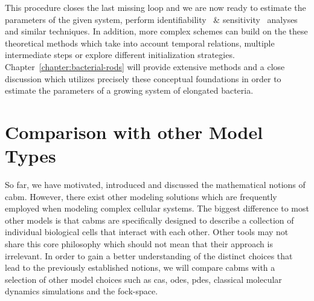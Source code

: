 This procedure closes the last missing loop and we are now ready to estimate the parameters of the
given system, perform identifiability~\cite{Raue2009} \& sensitivity~\cite{Saltelli2007} analyses
and similar techniques.
In addition, more complex schemes can build on the these theoretical methods which take into account
temporal relations, multiple intermediate steps or explore different initialization strategies.
Chapter~\ref{chapter:bacterial-rods} will provide extensive methods and a close discussion which
utilizes precisely these conceptual foundations in order to estimate the parameters of a growing
system of elongated bacteria.

\section{Comparison with other Model Types}
So far, we have motivated, introduced and discussed the mathematical notions of \ac{cabm}.
However, there exist other modeling solutions which are frequently employed when modeling complex
cellular systems.
The biggest difference to most other models is that \acp{cabm} are specifically designed to describe
a collection of individual biological cells that interact with each other.
Other tools may not share this core philosophy which should not mean that their approach is
irrelevant.
In order to gain a better understanding of the distinct choices that lead to the previously
established notions, we will compare \acp{cabm} with a selection of other model choices such as
\acp{ca}, \acp{ode}, \acp{pde}, classical molecular dynamics simulations and the fock-space.

